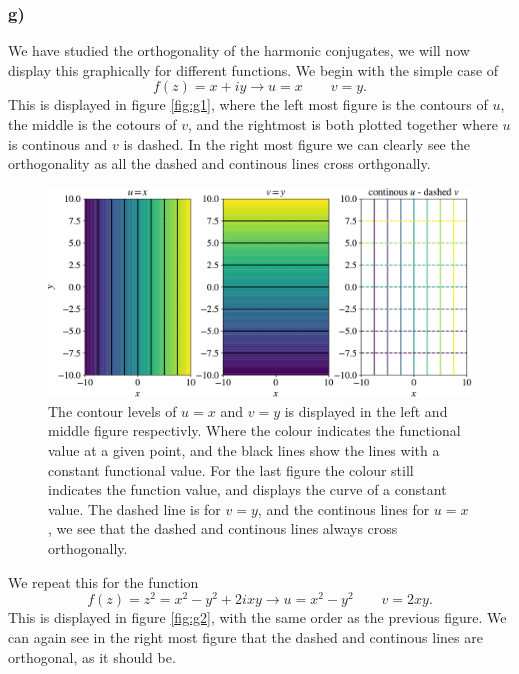 \documentclass[12pt,twoside]{article}
\begin{document}
\subsubsection*{g)}
We have studied the orthogonality of the harmonic conjugates, we will now display this graphically for different functions. We begin with the simple case of
\begin{equation}
  f(z) = x+iy \rightarrow u=x\qquad v=y.
\end{equation}
This is displayed in figure \vref{fig:g1}, where the left most figure is the contours of $u$, the middle is the cotours of $v$, and the rightmost is both plotted together where $u$ is continous and $v$ is dashed. In the right most figure we can clearly see the orthogonality as all the dashed and continous lines cross orthgonally.\par
\begin{figure}
  \centering
  \includegraphics[width=\textwidth]{../figures/first.pdf}
  \caption{The contour levels of $u=x$ and $v=y$ is displayed in the left and middle figure respectivly. Where the colour indicates the functional value at a given point, and the black lines show the lines with a constant functional value. For the last figure the colour still indicates the function value, and displays the curve of a  constant value. The dashed line is for $v=y$, and the continous lines for $u=x$, we see that the dashed and continous lines always cross orthogonally.}
  \label{fig:g1}
\end{figure}
We repeat this for the function
\begin{equation}
  f(z) = z^2 = x^2-y^2+2ixy \rightarrow u=x^2-y^2\qquad v=2xy.
\end{equation}
This is displayed in figure \vref{fig:g2}, with the same order as the previous figure. We can again see in the right most figure that the dashed and continous lines are orthogonal, as it should be.\par
\end{document}
